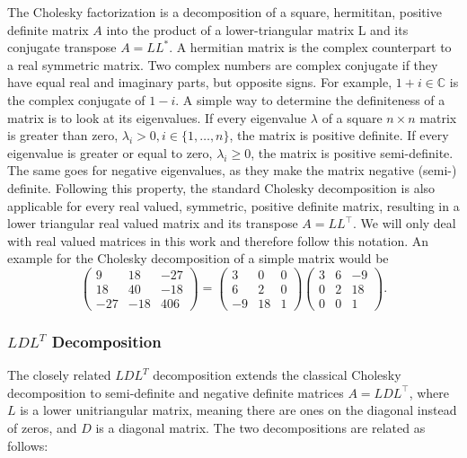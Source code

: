 The Cholesky factorization is a decomposition of a square, hermititan,
positive definite matrix $A$ into the product of a lower-triangular
matrix L and its conjugate transpose $A = L L^*$. A hermitian matrix is
the complex counterpart to a real symmetric matrix. Two complex numbers
are complex conjugate if they have equal real and imaginary parts, but
opposite signs. For example, $1+i \in \mathbb{C}$ is the complex
conjugate of $1-i$. A simple way to determine the definiteness of a
matrix is to look at its eigenvalues. If every eigenvalue $\lambda$ of a
square $n \times n$ matrix is greater than zero, $\lambda_{i} > 0, i \in
\{1,\dots,n\}$, the matrix is positive definite. If every eigenvalue is
greater or equal to zero, $\lambda_{i} \ge 0$, the matrix is positive
semi-definite. The same goes for negative eigenvalues, as they make the
matrix negative (semi-) definite. Following this property, the standard
Cholesky decomposition is also applicable for every real valued,
symmetric, positive definite matrix, resulting in a lower triangular
real valued matrix and its transpose $A = L L^\top$. We will only deal
with real valued matrices in this work and therefore follow this
notation. An example for the Cholesky decomposition of a simple matrix
would be
\begin{equation}\label{eq:chol}
  \begin{pmatrix}
    9 & 18 & -27\\
    18 & 40 & -18 \\
    -27 & -18 & 406
  \end{pmatrix}
  =
  \begin{pmatrix}
    3 & 0 & 0\\
    6 & 2 & 0 \\
    -9 & 18 & 1
  \end{pmatrix}
  \begin{pmatrix}
    3 & 6 & -9\\
    0 & 2 & 18 \\
    0 & 0 & 1
  \end{pmatrix}.
\end{equation}

\subsubsection{$LDL^T$ Decomposition}

The closely related $LDL^T$ decomposition extends the classical Cholesky
decomposition to semi-definite and negative definite matrices $A = L D
L^\top$, where $L$ is a lower unitriangular matrix, meaning there are
ones on the diagonal instead of zeros, and $D$ is a diagonal matrix. The
two decompositions are related as follows:

